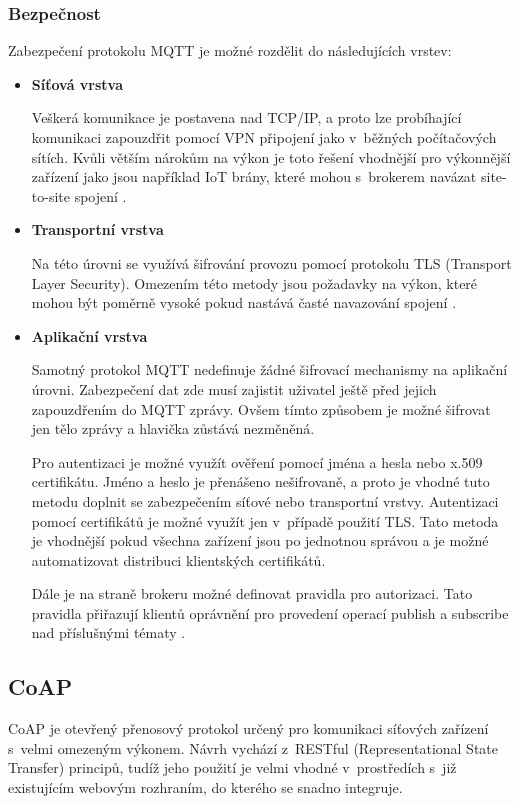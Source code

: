  \subsubsection{Bezpečnost}
 Zabezpečení protokolu MQTT je možné rozdělit do následujících vrstev:
 \begin{itemize}
  \item \textbf{Síťová vrstva}
  
    Veškerá komunikace je postavena nad TCP/IP, a proto lze probíhající komunikaci
    zapouzdřit pomocí VPN připojení
    jako v~běžných počítačových sítích. Kvůli větším nárokům na výkon je toto
    řešení vhodnější pro výkonnější zařízení jako jsou například IoT brány, které
    mohou s~brokerem navázat site-to-site spojení \cite{mqtt_sec}.
    
  \item \textbf{Transportní vrstva}
  
  Na této úrovni se využívá šifrování provozu pomocí protokolu TLS (Tra\-nsport
  Layer Security). Omezením této metody jsou požadavky na výkon, které mohou být
  poměrně vysoké pokud nastává časté navazování spojení \cite{mqtt_sec}.
  
  \item \textbf{Aplikační vrstva}
  
  Samotný protokol MQTT nedefinuje žádné šifrovací mechanismy na aplikační úrovni. 
  Zabezpečení dat zde musí zajistit uživatel ještě před jejich zapouzdřením do MQTT zprávy. 
  Ovšem tímto způsobem je možné šifrovat jen tělo zprávy a hlavička zůstává nezměněná.
  
  Pro autentizaci je možné využít ověření pomocí jména a hesla nebo x.509 certifikátu.
  Jméno a heslo je přenášeno nešifrovaně, a proto je vhodné tuto metodu doplnit se 
  zabezpečením síťové nebo transportní vrstvy. Autentizaci pomocí certifikátů 
  je možné využít jen v~případě použití TLS. Tato metoda je vhodnější pokud všechna
  zařízení jsou po jednotnou správou a je možné automatizovat distribuci 
  klientských certifikátů.
  
  Dále je na straně brokeru možné definovat pravidla pro autorizaci. Tato pravidla 
  přiřazují klientů oprávnění pro provedení operací publish a subscribe
  nad příslušnými tématy \cite{mqtt_sec}.
  
 \end{itemize}

  \subsection{CoAP}
  CoAP je otevřený přenosový protokol určený pro
  komunikaci síťových zařízení s~velmi omezeným výkonem. Návrh vychází z~RESTful
  (Representational State Transfer) principů, tudíž jeho použití je velmi vhodné
  v~prostředích s~již existujícím webovým rozhraním, do kterého se snadno integruje. \cite{coap}
  
